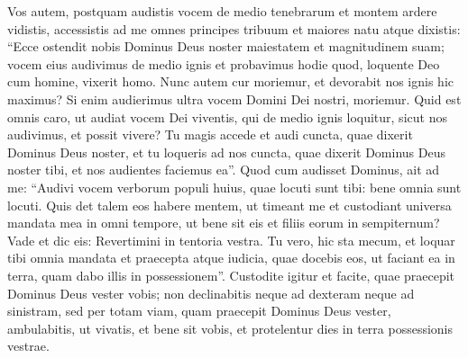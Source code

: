 \begin{biblechapter}
\verse Vos autem, postquam audistis vocem de medio tenebrarum et montem ardere vidistis, accessistis ad me omnes principes tribuum et maiores natu 
\verse atque dixistis: “Ecce ostendit nobis Dominus Deus noster maiestatem et magnitudinem suam; vocem eius audivimus de medio ignis et probavimus hodie quod, loquente Deo cum homine, vixerit homo. 
\verse Nunc autem cur moriemur, et devorabit nos ignis hic maximus? Si enim audierimus ultra vocem Domini Dei nostri, moriemur. 
\verse Quid est omnis caro, ut audiat vocem Dei viventis, qui de medio ignis loquitur, sicut nos audivimus, et possit vivere? 
\verse Tu magis accede et audi cuncta, quae dixerit Dominus Deus noster, et tu loqueris ad nos cuncta, quae dixerit Dominus Deus noster tibi, et nos audientes faciemus ea”. 
\verse Quod cum audisset Dominus, ait ad me: “Audivi vocem verborum populi huius, quae locuti sunt tibi: bene omnia sunt locuti. 
\verse Quis det talem eos habere mentem, ut timeant me et custodiant universa mandata mea in omni tempore, ut bene sit eis et filiis eorum in sempiternum? 
\verse Vade et dic eis: Revertimini in tentoria vestra. 
\verse Tu vero, hic sta mecum, et loquar tibi omnia mandata et praecepta atque iudicia, quae docebis eos, ut faciant ea in terra, quam dabo illis in possessionem”. 
\verse Custodite igitur et facite, quae praecepit Dominus Deus vester vobis; non declinabitis neque ad dexteram neque ad sinistram, 
\verse sed per totam viam, quam praecepit Dominus Deus vester, ambulabitis, ut vivatis, et bene sit vobis, et protelentur dies in terra possessionis vestrae. 
\end{biblechapter}

